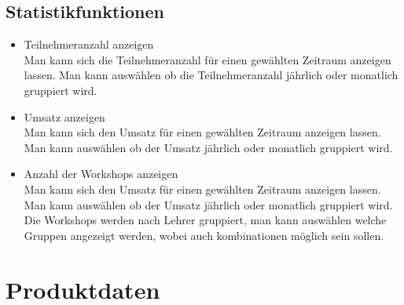 \subsection{Statistikfunktionen}
\begin{itemize}[leftmargin=1.0in]
    \item [\lf] Teilnehmeranzahl anzeigen\\
        Man kann sich die Teilnehmeranzahl für einen gewählten Zeitraum anzeigen lassen. Man kann auswählen ob die Teilnehmeranzahl jährlich oder monatlich gruppiert wird.
    \item [\lf] Umsatz anzeigen\\
        Man kann sich den Umsatz für einen gewählten Zeitraum anzeigen lassen. Man kann auswählen ob der Umsatz jährlich oder monatlich gruppiert wird.
    \item [\lf] Anzahl der Workshops anzeigen\\
        Man kann sich den Umsatz für einen gewählten Zeitraum anzeigen lassen. Man kann auswählen ob der Umsatz jährlich oder monatlich gruppiert wird. Die Workshops werden nach Lehrer gruppiert, man kann auswählen welche Gruppen angezeigt werden, wobei auch kombinationen möglich sein sollen. 
\end{itemize}
\section{Produktdaten}

